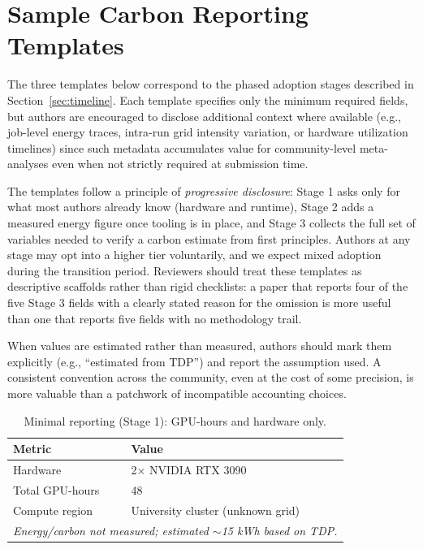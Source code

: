 \documentclass{article}
\theoremstyle{plain}
\theoremstyle{definition}
\theoremstyle{remark}
\begin{document}
\section{Sample Carbon Reporting Templates}
\label{app:templates}

The three templates below correspond to the phased adoption stages described in Section~\ref{sec:timeline}. Each template specifies only the minimum required fields, but authors are encouraged to disclose additional context where available (e.g., job-level energy traces, intra-run grid intensity variation, or hardware utilization timelines) since such metadata accumulates value for community-level meta-analyses even when not strictly required at submission time.

The templates follow a principle of \emph{progressive disclosure}: Stage 1 asks only for what most authors already know (hardware and runtime), Stage 2 adds a measured energy figure once tooling is in place, and Stage 3 collects the full set of variables needed to verify a carbon estimate from first principles. Authors at any stage may opt into a higher tier voluntarily, and we expect mixed adoption during the transition period. Reviewers should treat these templates as descriptive scaffolds rather than rigid checklists: a paper that reports four of the five Stage 3 fields with a clearly stated reason for the omission is more useful than one that reports five fields with no methodology trail.

When values are estimated rather than measured, authors should mark them explicitly (e.g., ``estimated from TDP'') and report the assumption used. A consistent convention across the community, even at the cost of some precision, is more valuable than a patchwork of incompatible accounting choices.

\begin{table}[!ht]
\caption{Minimal reporting (Stage 1): GPU-hours and hardware only.}
\label{tab:minimal-report}
\begin{center}
\begin{tabular}{p{5cm}p{10cm}}
\toprule
\textbf{Metric} & \textbf{Value} \\
\midrule
Hardware & 2$\times$ NVIDIA RTX 3090 \\
Total GPU-hours & 48 \\
Compute region & University cluster (unknown grid) \\
\midrule
\multicolumn{2}{p{15cm}}{\textit{Energy/carbon not measured; estimated $\sim$15 kWh based on TDP.}} \\
\bottomrule
\end{tabular}
\end{center}
\end{table}
\end{document}
